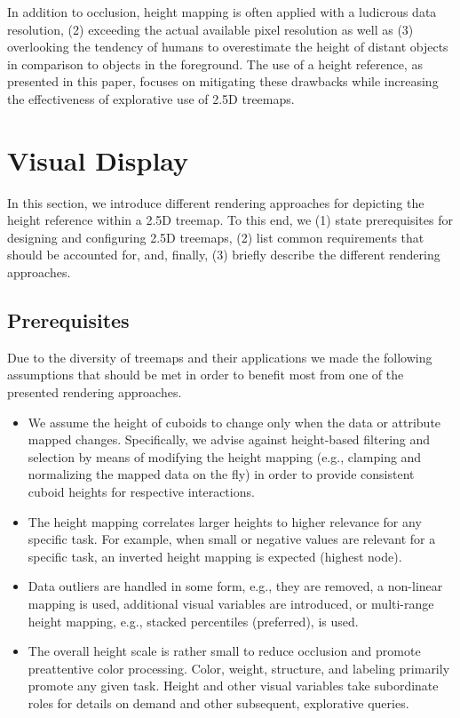 \documentclass[sigconf]{acmart}
\begin{document}
In addition to occlusion, height mapping is often applied with a ludicrous data resolution, (2) exceeding the actual available pixel resolution as well as (3) overlooking the tendency of humans to overestimate the height of distant objects in comparison to objects in the foreground. %
The use of a height reference, as presented in this paper, focuses on mitigating these drawbacks while increasing the effectiveness of explorative use of 2.5D treemaps.

\section{Visual Display}
\label{sec:visual-display}
In this section, we introduce different rendering approaches for depicting the height reference within a 2.5D treemap.
To this end, we (1) state prerequisites for designing and configuring 2.5D treemaps, (2) list common requirements that should be accounted for, and, finally, (3) briefly describe the different rendering approaches.

\subsection{Prerequisites}
Due to the diversity of treemaps and their applications we made the following assumptions that should be met in order to benefit most from one of the presented rendering approaches.

\begin{itemize}
	\item We assume the height of cuboids to change only when the data or attribute mapped changes.
	Specifically, we advise against height-based filtering and selection by means of modifying the height mapping (e.g., clamping and normalizing the mapped data on the fly) in order to provide consistent cuboid heights for respective interactions.
	\item The height mapping correlates larger heights to higher relevance for any specific task.
	For example, when small or negative values are relevant for a specific task, an inverted height mapping is expected (highest node).
	\item Data outliers are handled in some form, e.g., they are removed, a non-linear mapping is used, additional visual variables are introduced, or multi-range height mapping, e.g., stacked percentiles (preferred), is used.
	\item The overall height scale is rather small to reduce occlusion and promote preattentive color processing.
	Color, weight, structure, and labeling primarily promote any given task. 
	Height and other visual variables take subordinate roles for details on demand and other subsequent, explorative queries.
\end{itemize}
\end{document}
